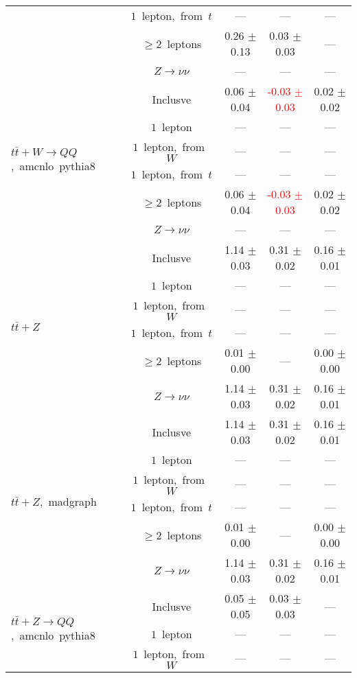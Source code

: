\documentclass{article}
\begin{document}
\begin{longtable}{|l|c|c|c|c|}
 & $1$~lepton,~from~$t$  & ---  & ---  & --- \\* 
 & $\ge2$~leptons  & 0.26 $\pm$ 0.13  & 0.03 $\pm$ 0.03  & --- \\* 
 & $Z\rightarrow\nu\nu$  & ---  & ---  & --- \\* 
\hline 
\multirow{6}{*}{$t\bar{t}+W{\rightarrow}QQ$,~amcnlo~pythia8} & Inclusve  & 0.06 $\pm$ 0.04  & \textcolor{red}{ -0.03 $\pm$ 0.03 }  & 0.02 $\pm$ 0.02 \\* 
 & $1$~lepton  & ---  & ---  & --- \\* 
 & $1$~lepton,~from~$W$  & ---  & ---  & --- \\* 
 & $1$~lepton,~from~$t$  & ---  & ---  & --- \\* 
 & $\ge2$~leptons  & 0.06 $\pm$ 0.04  & \textcolor{red}{ -0.03 $\pm$ 0.03 }  & 0.02 $\pm$ 0.02 \\* 
 & $Z\rightarrow\nu\nu$  & ---  & ---  & --- \\* 
\hline 
\multirow{6}{*}{$t\bar{t}+Z$} & Inclusve  & 1.14 $\pm$ 0.03  & 0.31 $\pm$ 0.02  & 0.16 $\pm$ 0.01 \\* 
 & $1$~lepton  & ---  & ---  & --- \\* 
 & $1$~lepton,~from~$W$  & ---  & ---  & --- \\* 
 & $1$~lepton,~from~$t$  & ---  & ---  & --- \\* 
 & $\ge2$~leptons  & 0.01 $\pm$ 0.00  & ---  & 0.00 $\pm$ 0.00 \\* 
 & $Z\rightarrow\nu\nu$  & 1.14 $\pm$ 0.03  & 0.31 $\pm$ 0.02  & 0.16 $\pm$ 0.01 \\* 
\hline 
\multirow{6}{*}{$t\bar{t}+Z$,~madgraph} & Inclusve  & 1.14 $\pm$ 0.03  & 0.31 $\pm$ 0.02  & 0.16 $\pm$ 0.01 \\* 
 & $1$~lepton  & ---  & ---  & --- \\* 
 & $1$~lepton,~from~$W$  & ---  & ---  & --- \\* 
 & $1$~lepton,~from~$t$  & ---  & ---  & --- \\* 
 & $\ge2$~leptons  & 0.01 $\pm$ 0.00  & ---  & 0.00 $\pm$ 0.00 \\* 
 & $Z\rightarrow\nu\nu$  & 1.14 $\pm$ 0.03  & 0.31 $\pm$ 0.02  & 0.16 $\pm$ 0.01 \\* 
\hline 
\multirow{6}{*}{$t\bar{t}+Z{\rightarrow}QQ$,~amcnlo~pythia8} & Inclusve  & 0.05 $\pm$ 0.05  & 0.03 $\pm$ 0.03  & --- \\* 
 & $1$~lepton  & ---  & ---  & --- \\* 
 & $1$~lepton,~from~$W$  & ---  & ---  & --- \\* 

\end{longtable}
\end{document}
